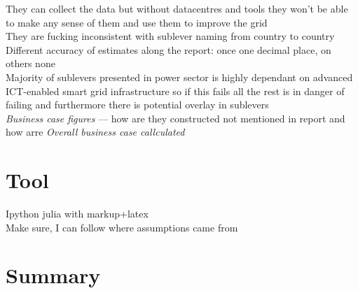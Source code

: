 \documentclass[11pt, twocolumn]{article}
\begin{document}
They can collect the data but without datacentres and tools they won't be able to make any sense of them and use them to improve the grid\\

They are fucking inconsistent with sublever naming from country to country\\

Different accuracy of estimates along the report: once one decimal place, on others none\\

Majority of sublevers presented in power sector is highly dependant on advanced ICT-enabled smart grid infrastructure so if this fails all the rest is in danger of failing and furthermore there is potential overlay in sublevers\\

\emph{Business case figures} --- how are they constructed not mentioned in report and how arre \emph{Overall business case callculated}

\section{Tool}
Ipython julia with markup+latex\\
Make sure, I can follow where assumptions came from

\section{Summary}
\end{document}
